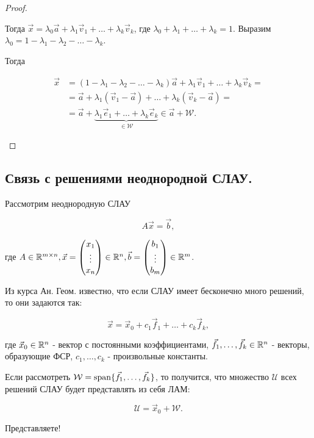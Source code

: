 \begin{proof}
\begin{enumerate}
        Тогда $\vec{x} = \lambda_0\vec{a} + \lambda_1\vec{v}_1 + \ldots + \lambda_k\vec{v}_k$, где $\lambda_0 + \lambda_1 + \ldots + \lambda_k = 1$. Выразим $\lambda_0 = 1 - \lambda_1 - \lambda_2 - \ldots - \lambda_k$.

        Тогда

        \begin{align*}
            \vec{x} &= (1 - \lambda_1 - \lambda_2 - \ldots - \lambda_k)\vec{a} + \lambda_1\vec{v}_1 + \ldots + \lambda_k\vec{v}_k = \\
            &= \vec{a} + \lambda_1(\vec{v}_1 - \vec{a}) + \ldots + \lambda_k(\vec{v}_k - \vec{a}) = \\
            &= \vec{a} + \underbrace{\lambda_1\vec{e}_1 + \ldots + \lambda_k\vec{e}_k}_{\in \mathcal{W}} \in \vec{a} + \mathcal{W}.
        \end{align*}
    \end{enumerate}
\end{proof}


\subsection{
    Связь с решениями неоднородной СЛАУ.
}

Рассмотрим неоднородную СЛАУ

$$A\vec{x} = \vec{b},$$

где $A \in \mathbb{R}^{m \times n}, \vec{x} = \begin{pmatrix} x_1 \\ \vdots \\ x_n \end{pmatrix} \in \mathbb{R}^n, \vec{b} = \begin{pmatrix} b_1 \\ \vdots \\ b_m \end{pmatrix} \in \mathbb{R}^m$.

Из курса Ан. Геом. известно, что если СЛАУ имеет бесконечно много решений, то они задаются так:

$$\vec{x} = \vec{x}_0 + c_1\vec{f}_1 + \ldots + c_k\vec{f}_k,$$

где $\vec{x}_0 \in \mathbb{R}^n$ - вектор с постоянными коэффициентами, $\vec{f}_1, \ldots, \vec{f}_k \in \mathbb{R}^n$ - векторы, образующие ФСР, $c_1, \ldots, c_k$ - произвольные константы.

Если рассмотреть $\mathcal{W} = \operatorname{\mathop{\mathrm{span}}} \{\vec{f}_1, \ldots, \vec{f}_k\}$, то получится, что множество $\mathcal{U}$ всех решений СЛАУ будет представлять из себя ЛАМ:

$$\mathcal{U} = \vec{x}_0 + \mathcal{W}.$$

Представляете!
